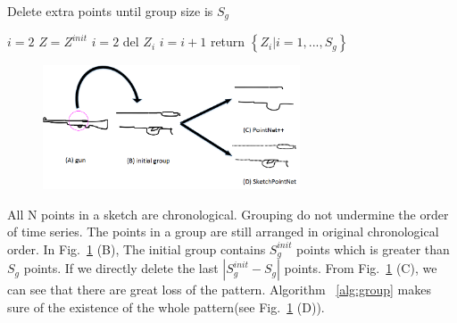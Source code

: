 \begin{algorithm}
\label{alg:group}
    \caption{Delete extra points until group size is $S_g$}
    $i = 2$\;
    $Z = Z^{init}$\;
    {
        {
            $i = 2$\;
        }
        del $Z_i$\;
        $i = i+1$\;
    }
    return $\left\{ Z_i| i = 1, ..., S_g \right\}$\;
\end{algorithm}

\begin{figure}
    \center
    \includegraphics[width=3in]{images/group.png}
    \label{fig:group}
\end{figure}

All N points in a sketch are chronological. Grouping do not undermine the order of time series. The points in a group are still arranged in original chronological order. In Fig.~\ref{fig:group} (B), The initial group contains $S_g^{init}$ points which is greater than $S_g$ points. If we directly delete the last $|S_g^{init}-S_g|$ points. From Fig.~\ref{fig:group} (C), we can see that there are great loss of the pattern.  Algorithm ~\ref{alg:group} makes sure of the existence of the whole pattern(see Fig.~\ref{fig:group} (D)).


